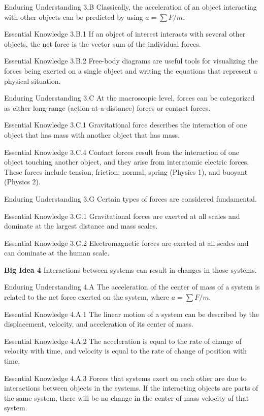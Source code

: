 \documentclass[
]{book}
\begin{document}
Enduring Understanding 3.B Classically, the acceleration of an object
interacting with other objects can be predicted by using
\(a = {\sum{F/m}}\).

Essential Knowledge 3.B.1 If an object of interest interacts with
several other objects, the net force is the vector sum of the individual
forces.

Essential Knowledge 3.B.2 Free-body diagrams are useful tools for
visualizing the forces being exerted on a single object and writing the
equations that represent a physical situation.

Enduring Understanding 3.C At the macroscopic level, forces can be
categorized as either long-range (action-at-a-distance) forces or
contact forces.

Essential Knowledge 3.C.1 Gravitational force describes the interaction
of one object that has mass with another object that has mass.

Essential Knowledge 3.C.4 Contact forces result from the interaction of
one object touching another object, and they arise from interatomic
electric forces. These forces include tension, friction, normal, spring
(Physics 1), and buoyant (Physics 2).

Enduring Understanding 3.G Certain types of forces are considered
fundamental.

Essential Knowledge 3.G.1 Gravitational forces are exerted at all scales
and dominate at the largest distance and mass scales.

Essential Knowledge 3.G.2 Electromagnetic forces are exerted at all
scales and can dominate at the human scale.

\textbf{Big Idea 4} Interactions between systems can result in changes in
those systems.

Enduring Understanding 4.A The acceleration of the center of mass of a
system is related to the net force exerted on the system, where
\(a = {\sum{F/m}}\).

Essential Knowledge 4.A.1 The linear motion of a system can be described
by the displacement, velocity, and acceleration of its center of mass.

Essential Knowledge 4.A.2 The acceleration is equal to the rate of
change of velocity with time, and velocity is equal to the rate of
change of position with time.

Essential Knowledge 4.A.3 Forces that systems exert on each other are
due to interactions between objects in the systems. If the interacting
objects are parts of the same system, there will be no change in the
center-of-mass velocity of that system.
\end{document}
